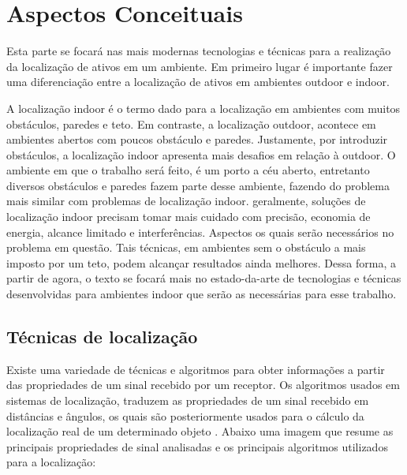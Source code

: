 \chapter{Aspectos Conceituais}
Esta parte se focará nas mais modernas tecnologias e técnicas para a realização da localização de ativos em um ambiente. Em primeiro lugar é importante fazer uma diferenciação entre a localização de ativos em ambientes outdoor e indoor.

A localização indoor é o termo dado para a localização em ambientes com muitos obstáculos, paredes e teto. Em contraste, a localização outdoor, acontece em ambientes abertos com poucos obstáculo e paredes. Justamente, por introduzir obstáculos, a localização indoor apresenta mais desafios em relação à outdoor. O ambiente em que o trabalho será feito, é um porto a céu aberto, entretanto diversos obstáculos e paredes fazem parte desse ambiente, fazendo do problema mais similar com problemas de localização indoor. geralmente, soluções de localização indoor precisam tomar mais cuidado com precisão, economia de energia, alcance limitado e interferências. Aspectos os quais serão necessários no problema em questão. Tais técnicas, em ambientes sem o obstáculo a mais imposto por um teto, podem alcançar resultados ainda melhores. Dessa forma, a partir de agora, o texto se focará mais no estado-da-arte de tecnologias e técnicas desenvolvidas para ambientes indoor que serão as necessárias para esse trabalho.

\section{Técnicas de localização}
Existe uma variedade de técnicas e algoritmos para obter informações a partir das propriedades de um sinal recebido por um receptor. Os algoritmos usados em sistemas de localização, traduzem as propriedades de um sinal recebido em distâncias e ângulos, os quais são posteriormente usados para o cálculo da localização real de um determinado objeto \cite{art5}. Abaixo uma imagem que resume as principais propriedades de sinal analisadas e os principais algoritmos utilizados para a localização:

